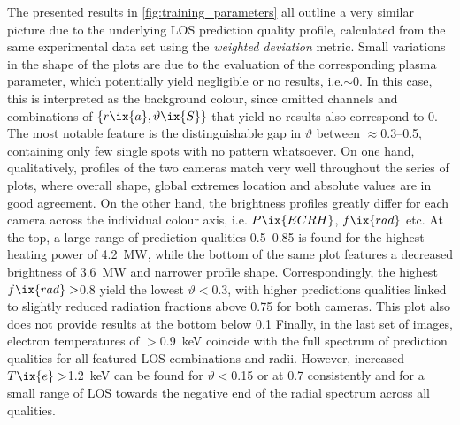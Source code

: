             The presented results in \cref{fig:training_parameters} all outline a very similar picture due to the underlying LOS prediction quality profile, calculated from the same experimental data set using the \textit{weighted deviation} metric. Small variations in the shape of the plots are due to the evaluation of the corresponding plasma parameter, which potentially yield negligible or no results, i.e.$\sim0$. In this case, this is interpreted as the background colour, since omitted channels and combinations of $\left\{r\ix{a}, \vartheta\ix{S}\right\}$ that yield no results also correspond to $0$. The most notable feature is the distinguishable gap in $\vartheta$ between $\approx$\SIrange{0.3}{0.5}{\arbitraryunit}, containing only few single spots with no pattern whatsoever. On one hand, qualitatively, profiles of the two cameras match very well throughout the series of plots, where overall shape, global extremes location and absolute values are in good agreement. On the other hand, the brightness profiles greatly differ for each camera across the individual colour axis, i.e. $P\ix{ECRH}$, $f\ix{rad}$ etc. At the top, a large range of prediction qualities \SIrange{0.5}{0.85}{\arbitraryunit} is found for the highest heating power of \SI{4.2}{\mega\watt}, while the bottom of the same plot features a decreased brightness of \SI{3.6}{\mega\watt} and narrower profile shape. Correspondingly, the highest $f\ix{rad}>$\SI{0.8}{\arbitraryunit} yield the lowest $\vartheta<$\SI{0.3}{\arbitraryunit}, with higher predictions qualities linked to slightly reduced radiation fractions above \SI{0.75}{\arbitraryunit} for both cameras. This plot also does not provide results at the bottom below \SI{0.1}{\arbitraryunit} Finally, in the last set of images, electron temperatures of $>$\SI{0.9}{\kilo\electronvolt} coincide with the full spectrum of prediction qualities for all featured LOS combinations and radii. However, increased $T\ix{e}>$\SI{1.2}{\kilo\electronvolt} can be found for $\vartheta<$\SI{0.15}{\arbitraryunit} or at \SI{0.7}{\arbitraryunit} consistently and for a small range of LOS towards the negative end of the radial spectrum across all qualities.\\%
